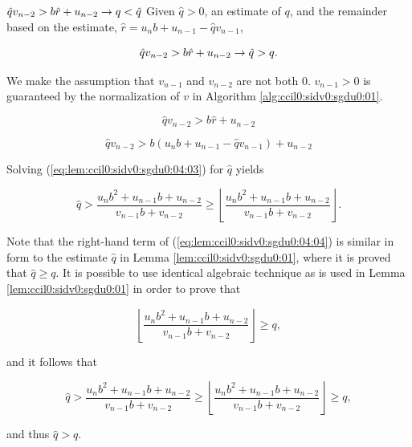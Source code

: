 \begin{vworklemmastatementpar}
{\mbox{\boldmath$\hat{q} v_{n-2} > b \hat{r} + u_{n-2} \to q < \hat{q}$}}
\label{lem:ccil0:sidv0:sgdu0:04}
Given $\hat{q} > 0$, an estimate of $q$, and the remainder
based on the estimate, $\hat{r} = u_n b + u_{n-1} - \hat{q} v_{n-1}$,

\begin{equation}
\label{eq:lem:ccil0:sidv0:sgdu0:04:01}
\hat{q} v_{n-2} > b \hat{r} + u_{n-2} \to \hat{q} > q .
\end{equation}
\end{vworklemmastatementpar}
\begin{vworklemmaproof}
We make the assumption that $v_{n-1}$ and $v_{n-2}$ are not both 0.
$v_{n-1} > 0$ is guaranteed by
the  normalization of 
$v$ in Algorithm \ref{alg:ccil0:sidv0:sgdu0:01}.

\begin{equation}
\label{eq:lem:ccil0:sidv0:sgdu0:04:02}
\hat{q} v_{n-2} > b \hat{r} + u_{n-2}
\end{equation}

\begin{equation}
\label{eq:lem:ccil0:sidv0:sgdu0:04:03}
\hat{q} v_{n-2} > b (u_n b + u_{n-1} - \hat{q} v_{n-1}) + u_{n-2}
\end{equation}

Solving (\ref{eq:lem:ccil0:sidv0:sgdu0:04:03}) for $\hat{q}$ yields

\begin{equation}
\label{eq:lem:ccil0:sidv0:sgdu0:04:04}
\hat{q} 
>
\frac{u_n b^2 + u_{n-1} b + u_{n-2}}{v_{n-1} b + v_{n-2}}
\geq
\left\lfloor {\frac{u_n b^2 + u_{n-1} b + u_{n-2}}{v_{n-1} b + v_{n-2}}} \right\rfloor
.
\end{equation}

Note that the right-hand term of 
(\ref{eq:lem:ccil0:sidv0:sgdu0:04:04})
is similar in form to the estimate $\hat{q}$ in
Lemma \ref{lem:ccil0:sidv0:sgdu0:01}, where it is proved that
$\hat{q} \geq q$.  It is possible to use identical algebraic technique
as is used in Lemma \ref{lem:ccil0:sidv0:sgdu0:01} in order to prove that

\begin{equation}
\label{eq:lem:ccil0:sidv0:sgdu0:04:05}
\left\lfloor {\frac{u_n b^2 + u_{n-1} b + u_{n-2}}{v_{n-1} b + v_{n-2}}} \right\rfloor
\geq q,
\end{equation}

and it follows that

\begin{equation}
\label{eq:lem:ccil0:sidv0:sgdu0:04:06}
\hat{q} 
>
\frac{u_n b^2 + u_{n-1} b + u_{n-2}}{v_{n-1} b + v_{n-2}}
\geq
\left\lfloor {\frac{u_n b^2 + u_{n-1} b + u_{n-2}}{v_{n-1} b + v_{n-2}}} \right\rfloor
\geq q,
\end{equation}

and thus $\hat{q} > q$.
\end{vworklemmaproof}
\vworklemmafooter{}

